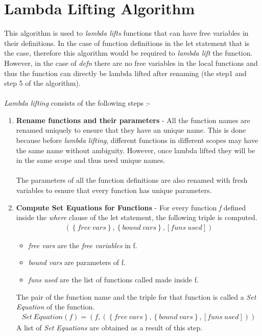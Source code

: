 \documentclass[11pt]{article}
\begin{document}
\section{Lambda Lifting Algorithm}\label{LamLiftAlg}
This algorithm is used to {\em lambda lifts} functions that can have free variables in their definitions. In the case of function definitions in the {\sf let} statement that is the case, therefore this algorithm would be required to {\em lambda lift} the function. However, in the case of {\em defn} there are no free variables in the local functions and thus the function can directly be lambda lifted after renaming (the step1 and step 5 of the algorithm). 
~~\\~\\ 
{\em Lambda lifting} consists of the following steps :-
\begin{enumerate}
    \item {\bf Rename functions and their parameters} - 
    All the function names are renamed uniquely to ensure that they have an unique name. This is done because before {\em lambda lifting}, different functions in different scopes may have the same name without ambiguity. However, once lambda lifted they will be in the same scope and thus need unique names.
    ~~\\~~\\ 
    The parameters of all the function definitions are also renamed with fresh variables to esnure that every function has unique parameters.
    \item {\bf Compute Set Equations for Functions} -
    For every function {\em f} defined inside the {\em where} clause of the {\sf let} statement, the following triple is computed.
    \begin{align*}
    (\left\{free~vars\right\},\left\{bound~vars\right\},[funs~used])
    \end{align*}
    \begin{itemize}
        \item {\em free vars}  are the {\em free variables} in f.
        \item {\em bound vars} are parameters of f. 
        \item {\em funs used}  are the list of functions called made inside f.
    \end{itemize}
    The pair of the function name and the triple for that function is called a {\em Set Equation} of the function.
    \begin{align*}
        Set~Equation (f) = (f,(\left\{free~vars\right\},\left\{bound~vars\right\},[funs~used]))
    \end{align*}
    A list of {\em Set Equations} are obtained as a result of this step. 
    

\end{enumerate}
\end{document}
